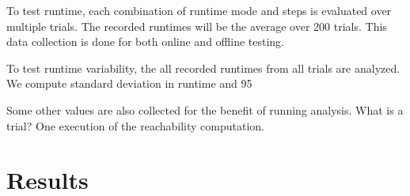 \documentclass[runningheads]{llncs}
\begin{document}
To test runtime, each combination of runtime mode and steps is evaluated over multiple trials. The recorded runtimes will be the average over 200 trials. This data collection is done for both online and offline testing.

To test runtime variability, the all recorded runtimes from all trials are analyzed. We compute standard deviation in runtime and 95%

Some other values are also collected for the benefit of running analysis. 
What is a trial? One execution of the reachability computation.  


\section{Results}
\end{document}
